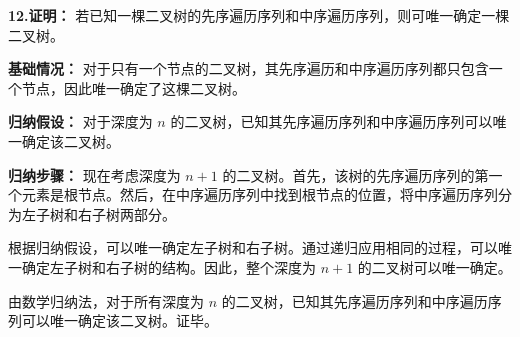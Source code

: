 \documentclass[UTF8]{ctexart}
\begin{document}
\textbf{12.证明：} 若已知一棵二叉树的先序遍历序列和中序遍历序列，则可唯一确定一棵二叉树。




\textbf{基础情况：} 对于只有一个节点的二叉树，其先序遍历和中序遍历序列都只包含一个节点，因此唯一确定了这棵二叉树。




\textbf{归纳假设：} 对于深度为 $n$ 的二叉树，已知其先序遍历序列和中序遍历序列可以唯一确定该二叉树。




\textbf{归纳步骤：} 现在考虑深度为 $n+1$ 的二叉树。首先，该树的先序遍历序列的第一个元素是根节点。然后，在中序遍历序列中找到根节点的位置，将中序遍历序列分为左子树和右子树两部分。

根据归纳假设，可以唯一确定左子树和右子树。通过递归应用相同的过程，可以唯一确定左子树和右子树的结构。因此，整个深度为 $n+1$ 的二叉树可以唯一确定。

由数学归纳法，对于所有深度为 $n$ 的二叉树，已知其先序遍历序列和中序遍历序列可以唯一确定该二叉树。证毕。
\end{document}
